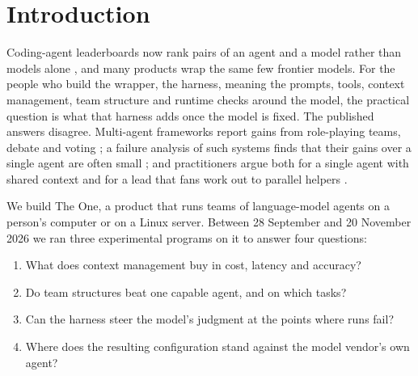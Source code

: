 \section{Introduction}
\label{sec:intro}

Coding-agent leaderboards now rank pairs of an agent and a model rather than models alone
\citep{tbench2026board,aa2026coding,kapoor2026hal}, and many products wrap the same few frontier
models. For the people who build the wrapper, the harness, meaning the prompts, tools, context
management, team structure and runtime checks around the model, the practical question is what that
harness adds once the model is fixed. The published answers disagree. Multi-agent frameworks report
gains from role-playing teams, debate and voting
\citep{wu2024autogen,hong2024metagpt,qian2024chatdev,du2024debate,li2024moreagents}; a failure
analysis of such systems finds that their gains over a single agent are often small
\citep{cemri2025mast}; and practitioners argue both for a single agent with shared context
\citep{yan2025dontbuild} and for a lead that fans work out to parallel helpers
\citep{anthropic2025multiagent}.

We build The One, a product that runs teams of language-model agents on a person's computer or on
a Linux server. Between 28 September and 20 November 2026 we ran three experimental programs on it
to answer four questions:
\begin{enumerate}[label=\textbf{RQ\arabic*},leftmargin=3.2em]
  \item What does context management buy in cost, latency and accuracy?
  \item Do team structures beat one capable agent, and on which tasks?
  \item Can the harness steer the model's judgment at the points where runs fail?
  \item Where does the resulting configuration stand against the model vendor's own agent?
\end{enumerate}

